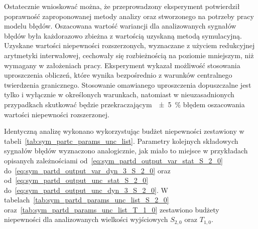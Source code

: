 Ostatecznie wnioskować można, że przeprowadzony eksperyment potwierdził poprawność zaproponowanej metody analizy oraz stworzonego na potrzeby pracy modelu błędów. Oszacowana wartość wariancji dla analizowanych sygnałów błędów była każdorazowo zbieżna z wartością uzyskaną metodą symulacyjną. Uzyskane wartości niepewności rozszerzonych, wyznaczane z użyciem redukcyjnej arytmetyki interwałowej, cechowały się rozbieżnością na poziomie mniejszym, niż wymagany w założeniach pracy. Eksperyment wykazał możliwość stosowania uproszczenia obliczeń, które wynika bezpośrednio z warunków centralnego twierdzenia granicznego. Stosowanie omawianego uproszczenia dopuszczalne jest tylko i wyłącznie w określonych warunkach, natomiast w nieuzasadnionych przypadkach skutkować będzie przekraczającym~\qty{\pm 5}{\percent} błędem oszacowania wartości niepewności rozszerzonej.

Identyczną analizę wykonano wykorzystując budżet niepewności zestawiony w tabeli~\ref{tab:sym_partc_params_unc_list}. Parametry kolejnych składowych sygnałów błędów wyznaczono analogicznie, jak miało to miejsce w przykładach opisanych zależnościami od~\eqref{eq:sym_partd_output_var_stat_S_2_0} do~\eqref{eq:sym_partd_output_var_dyn_3_S_2_0} oraz od~\eqref{eq:sym_partd_output_unc_stat_S_2_0} do~\eqref{eq:sym_partd_output_unc_dyn_3_S_2_0}. W tabelach~\ref{tab:sym_partd_params_unc_list_S_2_0} oraz~\ref{tab:sym_partd_params_unc_list_T_1_0} zestawiono budżety niepewności dla analizowanych wielkości wyjściowych $S_{2,0}$ oraz $T_{1,0}$.

